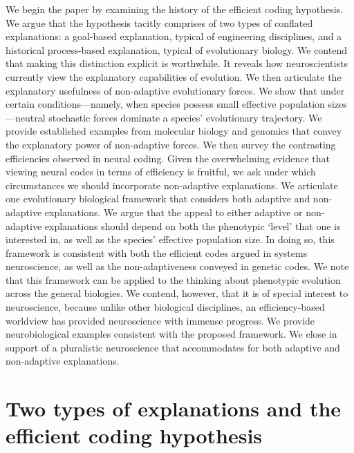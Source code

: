 \documentclass[twocolumn]{article}
\begin{document}
We begin the paper by examining the history of the efficient coding hypothesis. We argue that the hypothesis tacitly comprises of two types of conflated explanations: a goal-based explanation, typical of engineering disciplines, and a historical process-based explanation, typical of evolutionary biology. We contend that making this distinction explicit is worthwhile. It reveals how neuroscientists currently view the explanatory capabilities of evolution. We then articulate the explanatory usefulness of non-adaptive evolutionary forces. We show that under certain conditions---namely, when species possess small effective population sizes---neutral stochastic forces dominate a species' evolutionary trajectory. We provide established examples from molecular biology and genomics that convey the explanatory power of non-adaptive forces. We then survey the contrasting efficiencies observed in neural coding. Given the overwhelming evidence that viewing neural codes in terms of efficiency is fruitful, we ask under which circumstances we should incorporate non-adaptive explanations. We articulate one evolutionary biological framework that considers both adaptive and non-adaptive explanations. We argue that the appeal to either adaptive or non-adaptive explanations should depend on both the phenotypic `level' that one is interested in, as well as the species' effective population size. In doing so, this framework is consistent with both the efficient codes argued in systems neuroscience, as well as the non-adaptiveness conveyed in genetic codes. We note that this framework can be applied to the thinking about phenotypic evolution across the general biologies. We contend, however, that it is of special interest to neuroscience, because unlike other biological disciplines, an efficiency-based worldview has provided neuroscience with immense progress. We provide neurobiological examples consistent with the proposed framework. We close in support of a pluralistic neuroscience that accommodates for both adaptive and non-adaptive explanations. 

\section{Two types of explanations and the efficient coding hypothesis}
\end{document}
